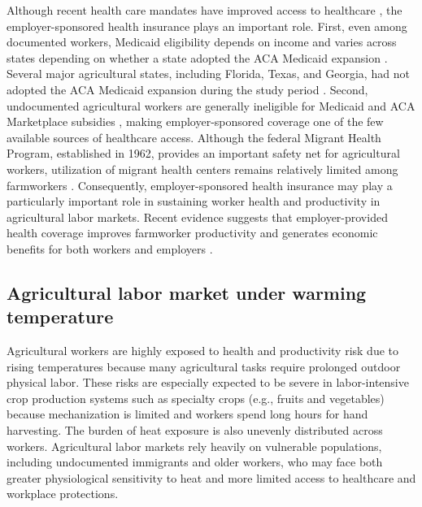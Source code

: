 \documentclass[12pt]{article}
\begin{document}
Although recent health care mandates have improved access to healthcare \citep{donkor_effects_2022}, the employer-sponsored health insurance plays an important role. First, even among documented workers, Medicaid eligibility depends on income and varies across states depending on whether a state adopted the ACA Medicaid expansion \citep{donkor_effects_2022, kandilov_impact_2022}. Several major agricultural states, including Florida, Texas, and Georgia, had not adopted the ACA Medicaid expansion during the study period \citep{kandilov_impact_2022}. Second, undocumented agricultural workers are generally ineligible for Medicaid and ACA Marketplace subsidies \citep{luo_health_2018}, making employer-sponsored coverage one of the few available sources of healthcare access. Although the federal Migrant Health Program, established in 1962, provides an important safety net for agricultural workers, utilization of migrant health centers remains relatively limited among farmworkers \citep{luo_health_2018}. Consequently, employer-sponsored health insurance may play a particularly important role in sustaining worker health and productivity in agricultural labor markets. Recent evidence suggests that employer-provided health coverage improves farmworker productivity and generates economic benefits for both workers and employers \citep{rutledge_health_2026}.



\subsection{Agricultural labor market under warming temperature}
Agricultural workers are highly exposed to health and productivity risk due to rising temperatures because many agricultural tasks require prolonged outdoor physical labor. These risks are especially expected to be severe in labor-intensive crop production systems such as specialty crops (e.g., fruits and vegetables) because mechanization is limited and workers spend long hours for hand harvesting. The burden of heat exposure is also unevenly distributed across workers. Agricultural labor markets rely heavily on vulnerable populations, including undocumented immigrants and older workers, who may face both greater physiological sensitivity to heat and more limited access to healthcare and workplace protections. 
\end{document}
